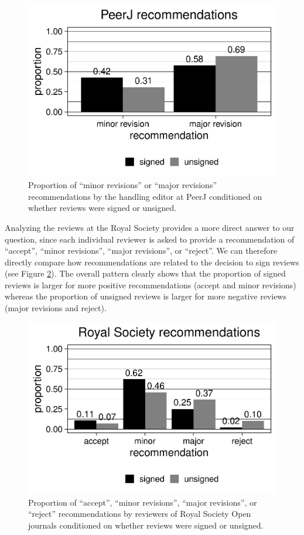 \documentclass[
  english,
  ,jou, a4paper,floatsintext]{apa6}
\begin{document}
\begin{figure}
\centering
\includegraphics{open_peer_review_files/figure-latex/PeerJrec-1.pdf}
\caption{\label{fig:PeerJrec}Proportion of \enquote{minor revisions} or \enquote{major revisions} recommendations by the handling editor at PeerJ conditioned on whether reviews were signed or unsigned.}
\end{figure}

Analyzing the reviews at the Royal Society provides a more direct answer to our question, since each individual reviewer is asked to provide a recommendation of \enquote{accept}, \enquote{minor revisions}, \enquote{major revisions}, or \enquote{reject}. We can therefore directly compare how recommendations are related to the decision to sign reviews (see Figure \ref{fig:TRSrec}). The overall pattern clearly shows that the proportion of signed reviews is larger for more positive recommendations (accept and minor revisions) whereas the proportion of unsigned reviews is larger for more negative reviews (major revisions and reject).

\begin{figure}
\centering
\includegraphics{open_peer_review_files/figure-latex/TRSrec-1.pdf}
\caption{\label{fig:TRSrec}Proportion of \enquote{accept}, \enquote{minor revisions}, \enquote{major revisions}, or \enquote{reject} recommendations by reviewers of Royal Society Open journals conditioned on whether reviews were signed or unsigned.}
\end{figure}
\end{document}
